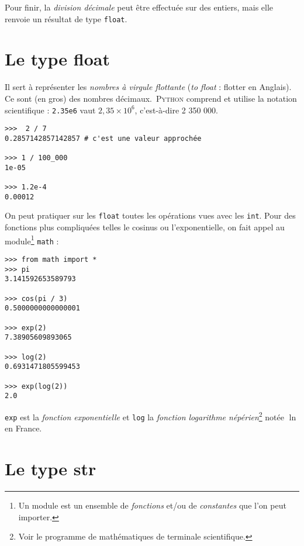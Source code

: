 Pour finir, la \textit{division décimale} peut être effectuée sur des entiers, mais elle renvoie un résultat de type \texttt{float}.

\section{Le type float}
Il sert à représenter les \textit{nombres à virgule flottante} (\textit{to float} : flotter en Anglais). Ce sont (en gros) des nombres
décimaux.\ \textsc{Python} comprend et utilise la notation scientifique : \texttt{2.35e6} vaut $2,35\times 10^6$, c'est-à-dire 2 350 000.

\begin{pyc}\begin{verbatim}
>>>  2 / 7
0.2857142857142857 # c'est une valeur approchée

>>> 1 / 100_000
1e-05

>>> 1.2e-4
0.00012
\end{verbatim}
\end{pyc}

On peut pratiquer sur les \texttt{float} toutes les opérations vues avec les \texttt{int}. Pour des fonctions plus compliquées telles le cosinus ou
l'exponentielle, on fait appel au module\footnote{Un module est un ensemble de \textit{fonctions} et/ou de \textit{constantes} que l'on peut importer.}
\texttt{math} :

\begin{pyc}\begin{verbatim}
>>> from math import *
>>> pi
3.141592653589793

>>> cos(pi / 3)
0.5000000000000001

>>> exp(2)
7.38905609893065

>>> log(2)
0.6931471805599453

>>> exp(log(2))
2.0
\end{verbatim}
\end{pyc}

\texttt{exp} est la \textit{fonction exponentielle} et \texttt{log} la \textit{fonction logarithme népérien}\footnote{Voir le programme de mathématiques
  de terminale scientifique.} notée $\ln$ en France.



\section{Le type str}

